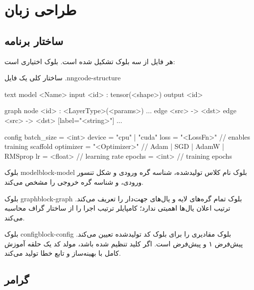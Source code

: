 \documentclass{nngraph-fa}
\begin{document}
\chapter{طراحی زبان}

\section{ساختار برنامه}

هر فایل  از سه بلوک تشکیل شده است. بلوک 
اختیاری است:

\begin{codebox}{ساختار کلی یک فایل .nng}{code-structure}
\begin{amzcode}{text}
model <Name> {
    input  <id> : tensor(<shape>)
    output <id>
}

graph {
    node <id> : <LayerType>(<params>)
    ...
    edge <src> -> <dst>
    edge <src> -> <dst> [label="<string>"]
    ...
}

config {
    batch_size = <int>
    device     = "cpu" | "cuda"
    loss       = "<LossFn>"       // enables training scaffold
    optimizer  = "<Optimizer>"    // Adam | SGD | AdamW | RMSprop
    lr         = <float>          // learning rate
    epochs     = <int>            // training epochs
}
\end{amzcode}
\end{codebox}

\begin{dfnbox}{بلوک model}{block-model}
بلوک  نام کلاس تولیدشده، شناسه گره ورودی و شکل تنسور
ورودی، و شناسه گره خروجی را مشخص می‌کند.
\end{dfnbox}

\begin{dfnbox}{بلوک graph}{block-graph}
بلوک  تمام گره‌های لایه و یال‌های جهت‌دار را تعریف
می‌کند. ترتیب اعلان یال‌ها اهمیتی ندارد؛ کامپایلر ترتیب اجرا را
از ساختار گراف محاسبه می‌کند.
\end{dfnbox}

\begin{dfnbox}{بلوک config}{block-config}
بلوک  مقادیری را برای بلوک  کد
تولیدشده تعیین می‌کند.  پیش‌فرض ۱ و 
پیش‌فرض  است. اگر کلید  تنظیم شده باشد،
مولد کد یک حلقه آموزش کامل با بهینه‌ساز و تابع خطا تولید می‌کند.
\end{dfnbox}

\section{گرامر}
\end{document}
